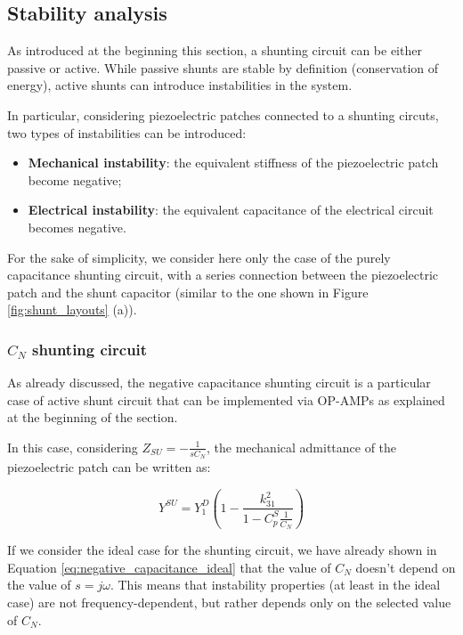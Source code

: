 \subsection{Stability analysis}
\label{subsec:stability_analysis}

As introduced at the beginning this section, a shunting circuit can be either passive or active.
While passive shunts are stable by definition (conservation of energy), active shunts can introduce instabilities in the system.

In particular, considering piezoelectric patches connected to a shunting circuts, two types of instabilities can be introduced:

\begin{itemize}
    \item \textbf{Mechanical instability}: the equivalent stiffness of the piezoelectric patch become negative;
    \item \textbf{Electrical instability}: the equivalent capacitance of the electrical circuit becomes negative.
\end{itemize}

For the sake of simplicity, we consider here only the case of the purely capacitance shunting circuit, with a series connection between the piezoelectric patch and the shunt capacitor (similar to the one shown in Figure \ref{fig:shunt_layouts} (a)).


\subsubsection{$C_N$ shunting circuit}
\label{subsubsec:stability_analysis_negative_capacitance}

As already discussed, the negative capacitance shunting circuit is a particular case of active shunt circuit that can be implemented via OP-AMPs as explained at the beginning of the section.

In this case, considering $Z_{SU} = -\frac{1}{sC_N}$, the mechanical admittance of the piezoelectric patch can be written as:

\begin{equation}
    Y^{SU} = Y_1^D \left( 1 - \frac{k_{31}^2}{1 - C_p^S \frac{1}{C_N}} \right)
\end{equation}

If we consider the ideal case for the shunting circuit, we have already shown in Equation \ref{eq:negative_capacitance_ideal} that the value of $C_N$ doesn't depend on the value of $s = j\omega$.
This means that instability properties (at least in the ideal case) are not frequency-dependent, but rather depends only on the selected value of $C_N$.

